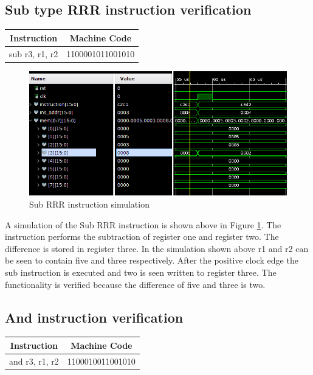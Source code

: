 \documentclass{article}
\begin{document}
	\subsection{Sub type RRR instruction verification}
		\vspace{.5cm}
		\begin{center}
			\begin{tabular}{|c|c|}
				\hline 
				\textbf{Instruction} & \textbf{Machine Code} \\ 
				\hline 
				sub r3, r1, r2 & 1100001011001010 \\ 
				\hline 
			\end{tabular} 
		\end{center}
		
		\begin{figure}[H]
			\centering
			\includegraphics[width=5in]{img/subinstest.png}
			\caption{Sub RRR instruction simulation}
			\label{fig:subrrrtest}
		\end{figure}
		
		\begin{par}
			A simulation of the Sub RRR instruction is shown above in Figure \ref{fig:subrrrtest}. The instruction performs the subtraction of register one and register two. The difference is stored in register three. In the simulation shown above r1 and r2 can be seen to contain five and three respectively. After the positive clock edge the sub instruction is executed and two is seen written to register three. The functionality is verified because the difference of five and three is two. 
		\end{par}
		\newpage

	\subsection{And instruction verification}
		\vspace{.5cm}
		\begin{center}
			\begin{tabular}{|c|c|}
				\hline 
				\textbf{Instruction} & \textbf{Machine Code} \\ 
				\hline 
				and r3, r1, r2 & 1100010011001010 \\ 
				\hline 
			\end{tabular} 
		\end{center}
		
\end{document}
